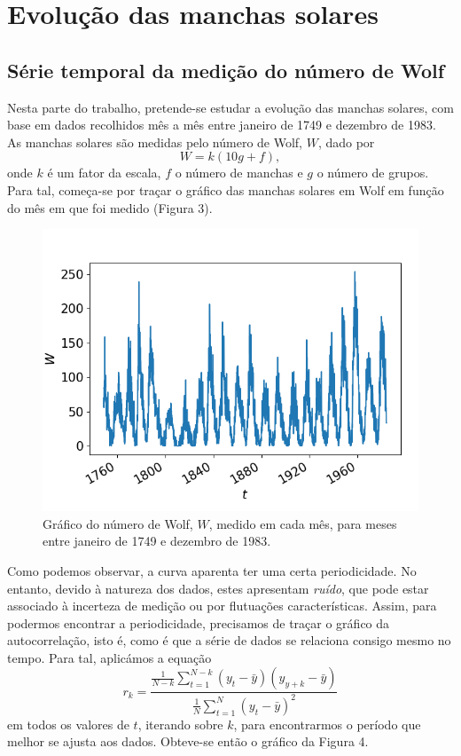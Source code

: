 \documentclass[aps,pre,twocolumn,showpacs,amsmath,amssymb]{revtex4-1}
\begin{document}
\section{Evolução das manchas solares}
\subsection{Série temporal da medição do número de Wolf}
Nesta parte do trabalho, pretende-se estudar a evolução das manchas solares, com base em dados recolhidos mês a mês entre janeiro de 1749 e dezembro de 1983. As manchas solares são medidas pelo número de Wolf, $W$, dado por
\begin{equation}
    W = k(10g + f),
\end{equation}
onde $k$ é um fator da escala, $f$ o número de manchas e $g$ o número de grupos. Para tal, começa-se por traçar o gráfico das manchas solares em Wolf em função do mês em que foi medido (Figura 3).

\begin{figure}[hbt!]
    \centering
    \includegraphics[width=\columnwidth]{temporalseries.png}
    \caption{Gráfico do número de Wolf, $W$, medido em cada mês, para meses entre janeiro de 1749 e dezembro de 1983.}
\end{figure}

Como podemos observar, a curva aparenta ter uma certa periodicidade. No entanto, devido à natureza dos dados, estes apresentam \textit{ruído}, que pode estar associado à incerteza de medição ou por flutuações características. Assim, para podermos encontrar a periodicidade, precisamos de traçar o gráfico da autocorrelação, isto é, como é que a série de dados se relaciona consigo mesmo no tempo. Para tal, aplicámos a equação
\begin{equation}
    r_k = \frac{\frac{1}{N-k}\sum_{t=1}^{N-k}(y_t - \bar{y})(y_{y+k} - \bar{y})}{\frac{1}{N}\sum_{t=1}^{N}(y_t - \bar{y})^2}
\end{equation}
em todos os valores de $t$, iterando sobre $k$, para encontrarmos o período que melhor se ajusta aos dados. Obteve-se então o gráfico da Figura 4.\\
\end{document}
